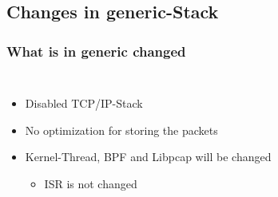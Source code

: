 \documentclass{beamer}
\begin{document}
\subsection*{Changes in generic-Stack}
\begin{frame}
\frametitle{What is in generic changed}
\begin{columns}
\begin{itemize}
	\item <2->Disabled TCP/IP-Stack\newline
	\item <3->No optimization for storing the packets\newline
	\item <4->Kernel-Thread, BPF and Libpcap will be changed\newline
		\begin{itemize}
			\item <4->ISR is not changed
		\end{itemize}
\end{itemize}
\vspace{-2em}

\end{columns}
\end{frame}
\end{document}

